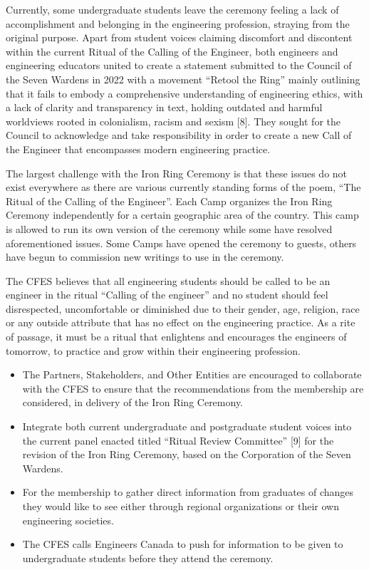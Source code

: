 Currently, some undergraduate students leave the ceremony feeling a lack of accomplishment and belonging in the engineering profession, straying from the original purpose. Apart from student voices claiming discomfort and discontent within the current Ritual of the Calling of the Engineer, both engineers and engineering educators united to create a statement submitted to the Council of the Seven Wardens in 2022 with a movement ``Retool the Ring'' mainly outlining that it fails to embody a comprehensive understanding of engineering ethics, with a lack of clarity and transparency in text, holding outdated and harmful worldviews rooted in colonialism, racism and sexism [8]. They sought for the Council to acknowledge and take responsibility in order to create a new Call of the Engineer that encompasses modern engineering practice.

The largest challenge with the Iron Ring Ceremony is that these issues do not exist everywhere as there are various currently standing forms of the poem, ``The Ritual of the Calling of the Engineer''. Each Camp organizes the Iron Ring Ceremony independently for a certain geographic area of the country. This camp is allowed to run its own version of the ceremony while some have resolved aforementioned issues. Some Camps have opened the ceremony to guests, others have begun to commission new writings to use in the ceremony.

The CFES believes that all engineering students should be called to be an engineer in the ritual ``Calling of the engineer'' and no student should feel disrespected, uncomfortable or diminished due to their gender, age, religion, race or any outside attribute that has no effect on the engineering practice. As a rite of passage, it must be a ritual that enlightens and encourages the engineers of tomorrow, to practice and grow within their engineering profession.

\begin{itemize}
 \item The Partners, Stakeholders, and Other Entities are encouraged to collaborate with the CFES to ensure that the recommendations from the membership are considered, in delivery of the Iron Ring Ceremony.
 \item Integrate both current undergraduate and postgraduate student voices into the current panel enacted titled ``Ritual Review Committee'' [9] for the revision of the Iron Ring Ceremony, based on the Corporation of the Seven Wardens.
 \item For the membership to gather direct information from graduates of changes they would like to see either through regional organizations or their own engineering societies.
 \item The CFES calls Engineers Canada to push for information to be given to undergraduate students before they attend the ceremony.
\end{itemize}

